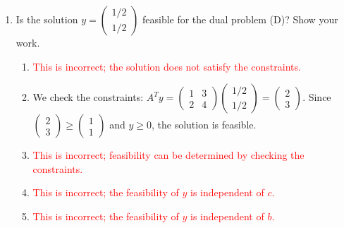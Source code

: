 \documentclass{article}%
\newcommand{\incorrect}[1]{\textcolor{red}{#1}}
\begin{document}
\begin{enumerate}
\begin{enumerate}
\begin{enumerate}
\item \incorrect{This is incorrect; it is close but not the correct answer.}%
\item \incorrect{This is the correct answer in fraction form.}%
\end{enumerate}%
\vspace{0.5em}%
\item Is the solution $y = \begin{pmatrix} 1/2 \\ 1/2 \end{pmatrix}$ feasible for the dual problem (D)? Show your work.%
\begin{enumerate}%
\item \incorrect{This is incorrect; the solution does not satisfy the constraints.}%
\item We check the constraints: $A^T y = \begin{pmatrix} 1 & 3 \\ 2 & 4 \end{pmatrix} \begin{pmatrix} 1/2 \\ 1/2 \end{pmatrix} = \begin{pmatrix} 2 \\ 3 \end{pmatrix}$. Since $\begin{pmatrix} 2 \\ 3 \end{pmatrix} \ge \begin{pmatrix} 1 \\ 1 \end{pmatrix}$ and $y \ge 0$, the solution is feasible.%
\item \incorrect{This is incorrect; feasibility can be determined by checking the constraints.}%
\item \incorrect{This is incorrect; the feasibility of $y$ is independent of $c$.}%
\item \incorrect{This is incorrect; the feasibility of $y$ is independent of $b$.}%
\end{enumerate}%
\vspace{0.5em}%
\end{enumerate}%
\end{enumerate}

%
\end{document}
